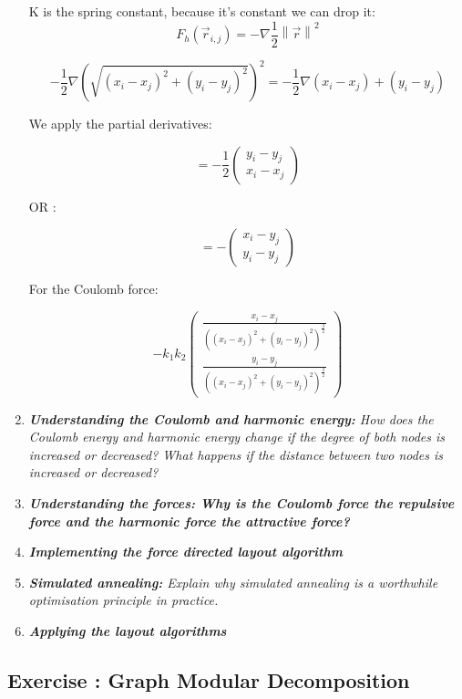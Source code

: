 \documentclass[10pt,a4paper]{article}
\newcommand{\norm}[1]{\left\lVert#1\right\rVert}
\newcommand{\exercise}[1]
{
  \stepcounter{subsection}
  \subsection*{Exercise \thesubsection: #1}

}
\begin{document}
\begin{enumerate}
	K is the spring constant, because it's constant we can drop it: 
	\[ F_{h}(\vec{r}_{i,j}) = -\nabla\frac{1}{2} \norm{\vec{r}}^2 \]
	
	\[-\frac{1}{2} \nabla\left(\sqrt{(x_i - x_j)^2 + (y_i - y_j)^2 }\right)^2 = -\frac{1}{2} \nabla(x_i - x_j)+(y_i - y_j) \]
	
	We apply the partial derivatives: 
	
	\[= -\frac{1}{2} \begin{pmatrix}
	y_i - y_j\\
	x_i - x_j
	\end{pmatrix} \]


	OR : 
	
	\[ = -\begin{pmatrix}
	x_i - y_j\\
	y_i - y_j
	\end{pmatrix} \]

	
	For the Coulomb force:
	
	\[ -k_1 k_2 \begin{pmatrix}
	\frac{x_i - x_j}{\left( (x_i - x_j)^2 + (y_i - y_j)^2 \right)^{\frac{3}{2}}}\\
	\frac{y_i - y_j}{\left( (x_i - x_j)^2 + (y_i - y_j)^2 \right)^{\frac{3}{2}}}
	\end{pmatrix} \]

	\item \textit{\textbf{Understanding the Coulomb and harmonic energy:} How does the Coulomb energy and harmonic energy change if the degree of both nodes is increased or decreased? What happens if the distance between two nodes is increased or decreased?}
	
	
	\item \textit{\textbf{\textbf{Understanding the forces:} Why is the Coulomb force the repulsive
			force and the harmonic force the attractive force?}}
	
	
	\item \textit{\textbf{Implementing the force directed layout algorithm}}
	
	
	\item \textit{\textbf{Simulated annealing:} Explain why simulated annealing is a worthwhile optimisation principle in practice.}
	
	
	\item \textit{\textbf{Applying the layout algorithms}}

\end{enumerate}


\newpage
\exercise{Graph Modular Decomposition}
\end{document}
